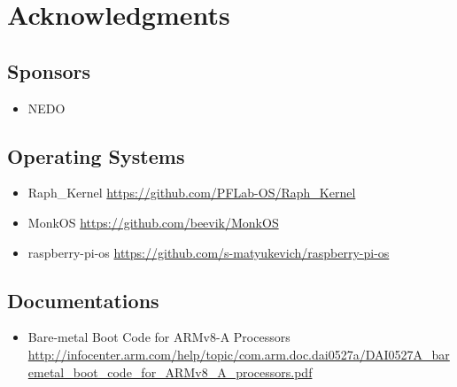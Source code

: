 \section{Acknowledgments}

\subsection{Sponsors}

\begin{itemize}
\item NEDO
\end{itemize}

\subsection{Operating Systems}

\begin{itemize}
\item Raph\_Kernel
  \url{https://github.com/PFLab-OS/Raph_Kernel}
\item MonkOS
  \url{https://github.com/beevik/MonkOS}
\item raspberry-pi-os
  \url{https://github.com/s-matyukevich/raspberry-pi-os}
\end{itemize}

\subsection{Documentations}

\begin{itemize}
\item Bare-metal Boot Code for ARMv8-A Processors
  \url{http://infocenter.arm.com/help/topic/com.arm.doc.dai0527a/DAI0527A_baremetal_boot_code_for_ARMv8_A_processors.pdf}
\end{itemize}

